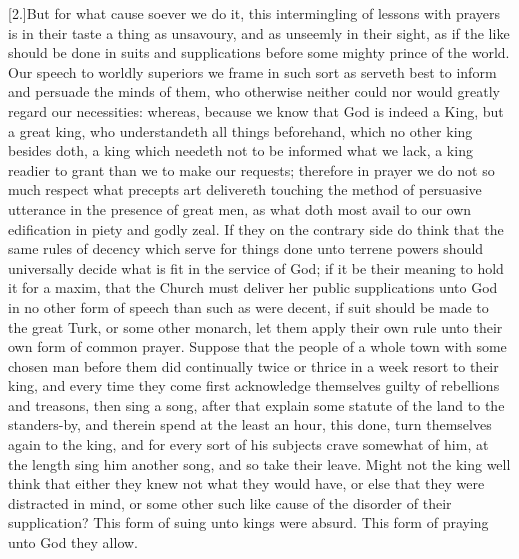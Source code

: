 [2.]But for what cause soever we do it, this intermingling of lessons with prayers is in their taste a thing as unsavoury, and as unseemly in their sight, as if the like should be done in suits and supplications before some mighty prince of the world. Our speech to worldly superiors we frame in such sort as serveth best to inform and persuade the minds of them, who otherwise neither could nor would greatly regard our necessities: whereas, because we know that God is indeed a King, but a great king, who understandeth all things beforehand, which no other king besides doth, a king which needeth not to be informed what we lack, a king readier to grant than we to make our requests; therefore in prayer we do not so much respect what precepts art delivereth touching the method of persuasive utterance in the presence of great men, as what doth most avail to our own edification in piety and godly zeal. If they on the contrary side do think that the same rules of decency which serve for things done unto terrene powers should universally decide what is fit in the service of God; if it be their meaning to hold it for a maxim, that the Church must deliver her public supplications unto God in no other form of speech than such as were decent, if suit should be made to the great Turk, or some other monarch, let them apply their own rule unto their own form of common prayer. Suppose that the people of a whole town with some chosen man before them did continually twice or thrice in a week resort to their king, and every time they come first acknowledge themselves guilty of rebellions and treasons, then sing a song, after that explain some statute of the land to the standers-by, and therein  spend at the least an hour, this done, turn themselves again to the king, and for every sort of his subjects crave somewhat of him, at the length sing him another song, and so take their leave.
 Might not the king well think that either they knew not what they would have, or else that they were distracted in mind, or some other such like cause of the disorder of their supplication? This form of suing unto kings were absurd. This form of praying unto God they allow.

